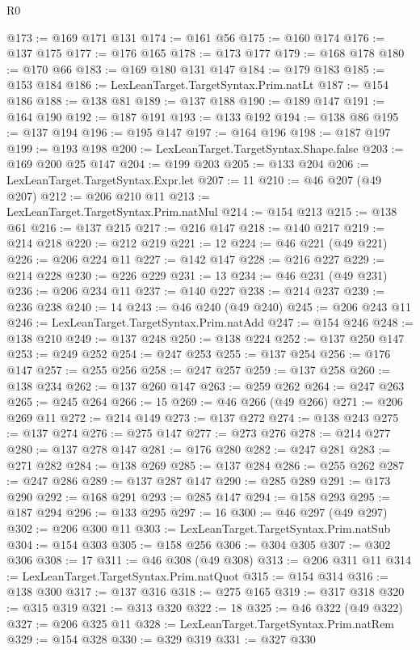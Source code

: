 \begin{lexlean}{R0}
\begin{coremodule}
@173 := @169 @171 @131
@174 := @161 @56
@175 := @160 @174
@176 := @137 @175
@177 := @176 @165
@178 := @173 @177
@179 := @168 @178
@180 := @170 @66
@183 := @169 @180 @131 @147
@184 := @179 @183
@185 := @153 @184
@186 := LexLeanTarget.TargetSyntax.Prim.natLt
@187 := @154 @186
@188 := @138 @81
@189 := @137 @188
@190 := @189 @147
@191 := @164 @190
@192 := @187 @191
@193 := @133 @192
@194 := @138 @86
@195 := @137 @194
@196 := @195 @147
@197 := @164 @196
@198 := @187 @197
@199 := @193 @198
@200 := LexLeanTarget.TargetSyntax.Shape.false
@203 := @169 @200 @25 @147
@204 := @199 @203
@205 := @133 @204
@206 := LexLeanTarget.TargetSyntax.Expr.let
@207 := 11
@210 := @46 @207 (@49 @207)
@212 := @206 @210 @11
@213 := LexLeanTarget.TargetSyntax.Prim.natMul
@214 := @154 @213
@215 := @138 @61
@216 := @137 @215
@217 := @216 @147
@218 := @140 @217
@219 := @214 @218
@220 := @212 @219
@221 := 12
@224 := @46 @221 (@49 @221)
@226 := @206 @224 @11
@227 := @142 @147
@228 := @216 @227
@229 := @214 @228
@230 := @226 @229
@231 := 13
@234 := @46 @231 (@49 @231)
@236 := @206 @234 @11
@237 := @140 @227
@238 := @214 @237
@239 := @236 @238
@240 := 14
@243 := @46 @240 (@49 @240)
@245 := @206 @243 @11
@246 := LexLeanTarget.TargetSyntax.Prim.natAdd
@247 := @154 @246
@248 := @138 @210
@249 := @137 @248
@250 := @138 @224
@252 := @137 @250 @147
@253 := @249 @252
@254 := @247 @253
@255 := @137 @254
@256 := @176 @147
@257 := @255 @256
@258 := @247 @257
@259 := @137 @258
@260 := @138 @234
@262 := @137 @260 @147
@263 := @259 @262
@264 := @247 @263
@265 := @245 @264
@266 := 15
@269 := @46 @266 (@49 @266)
@271 := @206 @269 @11
@272 := @214 @149
@273 := @137 @272
@274 := @138 @243
@275 := @137 @274
@276 := @275 @147
@277 := @273 @276
@278 := @214 @277
@280 := @137 @278 @147
@281 := @176 @280
@282 := @247 @281
@283 := @271 @282
@284 := @138 @269
@285 := @137 @284
@286 := @255 @262
@287 := @247 @286
@289 := @137 @287 @147
@290 := @285 @289
@291 := @173 @290
@292 := @168 @291
@293 := @285 @147
@294 := @158 @293
@295 := @187 @294
@296 := @133 @295
@297 := 16
@300 := @46 @297 (@49 @297)
@302 := @206 @300 @11
@303 := LexLeanTarget.TargetSyntax.Prim.natSub
@304 := @154 @303
@305 := @158 @256
@306 := @304 @305
@307 := @302 @306
@308 := 17
@311 := @46 @308 (@49 @308)
@313 := @206 @311 @11
@314 := LexLeanTarget.TargetSyntax.Prim.natQuot
@315 := @154 @314
@316 := @138 @300
@317 := @137 @316
@318 := @275 @165
@319 := @317 @318
@320 := @315 @319
@321 := @313 @320
@322 := 18
@325 := @46 @322 (@49 @322)
@327 := @206 @325 @11
@328 := LexLeanTarget.TargetSyntax.Prim.natRem
@329 := @154 @328
@330 := @329 @319
@331 := @327 @330

\end{coremodule}
\end{lexlean}
